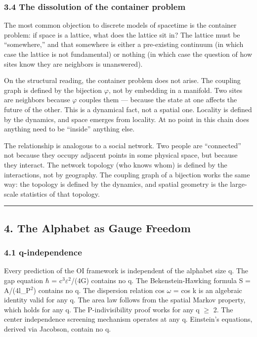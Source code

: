 \documentclass[
  11pt,
]{article}
\begin{document}
\hypertarget{the-dissolution-of-the-container-problem}{%
\subsubsection{3.4 The dissolution of the container
problem}\label{the-dissolution-of-the-container-problem}}

The most common objection to discrete models of spacetime is the
container problem: if space is a lattice, what does the lattice sit in?
The lattice must be ``somewhere,'' and that somewhere is either a
pre-existing continuum (in which case the lattice is not fundamental) or
nothing (in which case the question of how sites know they are neighbors
is unanswered).

On the structural reading, the container problem does not arise. The
coupling graph is defined by the bijection \ensuremath{\varphi}, not by embedding in a
manifold. Two sites are neighbors because \ensuremath{\varphi} couples them --- because the
state at one affects the future of the other. This is a dynamical fact,
not a spatial one. Locality is defined by the dynamics, and space
emerges from locality. At no point in this chain does anything need to
be ``inside'' anything else.

The relationship is analogous to a social network. Two people are
``connected'' not because they occupy adjacent points in some physical
space, but because they interact. The network topology (who knows whom)
is defined by the interactions, not by geography. The coupling graph of
a bijection works the same way: the topology is defined by the dynamics,
and spatial geometry is the large-scale statistics of that topology.

\begin{center}\rule{0.5\linewidth}{0.5pt}\end{center}

\hypertarget{the-alphabet-as-gauge-freedom}{%
\subsection{4. The Alphabet as Gauge
Freedom}\label{the-alphabet-as-gauge-freedom}}

\hypertarget{q-independence}{%
\subsubsection{4.1 q-independence}\label{q-independence}}

Every prediction of the OI framework is independent of the alphabet size
q. The gap equation \ensuremath{\hbar} = c\ensuremath{^3}\ensuremath{\varepsilon}\ensuremath{^2}/(4G) contains no q. The Bekenstein-Hawking
formula S = A/(4l\_P\ensuremath{^2}) contains no q. The dispersion relation cos \ensuremath{\omega} =
cos k is an algebraic identity valid for any q. The area law follows
from the spatial Markov property, which holds for any q. The
P-indivisibility proof works for any q \ensuremath{\geq} 2. The center independence
screening mechanism operates at any q. Einstein's equations, derived via
Jacobson, contain no q.
\end{document}
